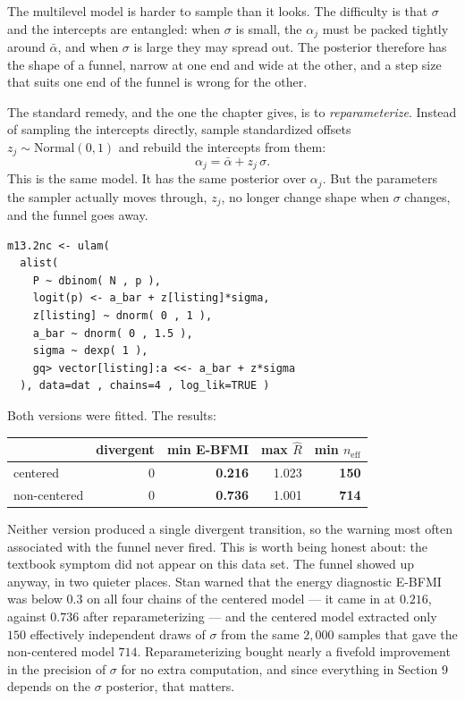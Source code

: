 \documentclass[11pt,a4paper]{article}
\begin{document}
The multilevel model is harder to sample than it looks. The difficulty is that
$\sigma$ and the intercepts are entangled: when $\sigma$ is small, the
$\alpha_j$ must be packed tightly around $\bar\alpha$, and when $\sigma$ is
large they may spread out. The posterior therefore has the shape of a funnel,
narrow at one end and wide at the other, and a step size that suits one end of
the funnel is wrong for the other.

The standard remedy, and the one the chapter gives, is to \emph{reparameterize}.
Instead of sampling the intercepts directly, sample standardized offsets
$z_j \sim \text{Normal}(0,1)$ and rebuild the intercepts from them:
\[
  \alpha_j = \bar\alpha + z_j\,\sigma .
\]
This is the same model. It has the same posterior over $\alpha_j$. But the
parameters the sampler actually moves through, $z_j$, no longer change shape
when $\sigma$ changes, and the funnel goes away.

\begin{lstlisting}
m13.2nc <- ulam(
  alist(
    P ~ dbinom( N , p ),
    logit(p) <- a_bar + z[listing]*sigma,
    z[listing] ~ dnorm( 0 , 1 ),
    a_bar ~ dnorm( 0 , 1.5 ),
    sigma ~ dexp( 1 ),
    gq> vector[listing]:a <<- a_bar + z*sigma
  ), data=dat , chains=4 , log_lik=TRUE )
\end{lstlisting}

Both versions were fitted. The results:

\begin{center}
\begin{tabular}{lrrrr}
\toprule
 & divergent & min E-BFMI & max $\hat{R}$ & min $n_{\text{eff}}$ \\
\midrule
centered      & 0 & \textbf{0.216} & 1.023 & \textbf{150} \\
non-centered  & 0 & \textbf{0.736} & 1.001 & \textbf{714} \\
\bottomrule
\end{tabular}
\end{center}

Neither version produced a single divergent transition, so the warning most
often associated with the funnel never fired. This is worth being honest about:
the textbook symptom did not appear on this data set. The funnel showed up
anyway, in two quieter places. Stan warned that the energy diagnostic E-BFMI
was below $0.3$ on all four chains of the centered model --- it came in at
$0.216$, against $0.736$ after reparameterizing --- and the centered model
extracted only $150$ effectively independent draws of $\sigma$ from the same
$2{,}000$ samples that gave the non-centered model $714$. Reparameterizing
bought nearly a fivefold improvement in the precision of $\sigma$ for no extra
computation, and since everything in Section 9 depends on the $\sigma$
posterior, that matters.
\end{document}
